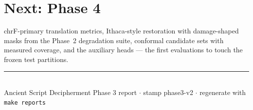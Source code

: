 \documentclass[11pt]{article}
\newcommand{\ReportStamp}{phase3-v2}
\begin{document}
\section{Next: Phase 4}
chrF-primary translation metrics, Ithaca-style restoration with damage-shaped
masks from the Phase~2 degradation suite, conformal candidate sets with
measured coverage, and the auxiliary heads --- the first evaluations to touch
the frozen test partitions.

\vfill
\noindent\rule{\linewidth}{0.4pt}\\
{\small Ancient Script Decipherment Phase 3 report \(\cdot\) stamp \ReportStamp{} \(\cdot\)
regenerate with \texttt{make reports}}
\end{document}
